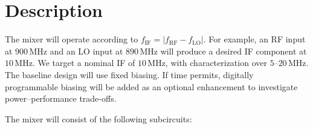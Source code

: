 
\section{Description}

The mixer will operate according to $f_{\mathrm{IF}}=\left|f_{\mathrm{RF}}-f_{\mathrm{LO}}\right|$.
For example, an RF input at \(900\,\mathrm{MHz}\) and an LO input at \(890\,\mathrm{MHz}\) will produce a desired IF component at \(10\,\mathrm{MHz}\).
We target a nominal IF of \(10\,\mathrm{MHz}\), with characterization over \(5\)--\(20\,\mathrm{MHz}\).
The baseline design will use fixed biasing.
If time permits, digitally programmable biasing will be added as an optional enhancement to investigate power--performance trade-offs.

The mixer will consist of the following subcircuits:

